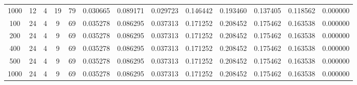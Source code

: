 \begin{table}[h]
\begin{tabular}{ccccccccccccc}
1000 & 12 & 4 & 19 & 79 & 0.030665 & 0.089171 & 0.029723 & 0.146442 & 0.193460 & 0.137405 & 0.118562 & 0.000000 \\
100 & 24 & 4 & 9 & 69 & 0.035278 & 0.086295 & 0.037313 & 0.171252 & 0.208452 & 0.175462 & 0.163538 & 0.000000 \\
200 & 24 & 4 & 9 & 69 & 0.035278 & 0.086295 & 0.037313 & 0.171252 & 0.208452 & 0.175462 & 0.163538 & 0.000000 \\
400 & 24 & 4 & 9 & 69 & 0.035278 & 0.086295 & 0.037313 & 0.171252 & 0.208452 & 0.175462 & 0.163538 & 0.000000 \\
500 & 24 & 4 & 9 & 69 & 0.035278 & 0.086295 & 0.037313 & 0.171252 & 0.208452 & 0.175462 & 0.163538 & 0.000000 \\
1000 & 24 & 4 & 9 & 69 & 0.035278 & 0.086295 & 0.037313 & 0.171252 & 0.208452 & 0.175462 & 0.163538 & 0.000000 \\
\bottomrule
\end{tabular}
\end{table}
